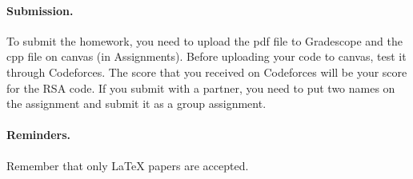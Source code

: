 \documentclass{article}
\begin{document}
\paragraph{Submission.}
To submit the homework, you need to upload the pdf file to Gradescope and the cpp file on canvas (in Assignments). Before uploading your code to canvas, test it through Codeforces. The score that you received on Codeforces will be your score for the RSA code. If you submit with a partner, you need
to put two names on the assignment and submit it as a group assignment.

\paragraph{Reminders.}
Remember that only {\LaTeX} papers are accepted. 
\end{document}
